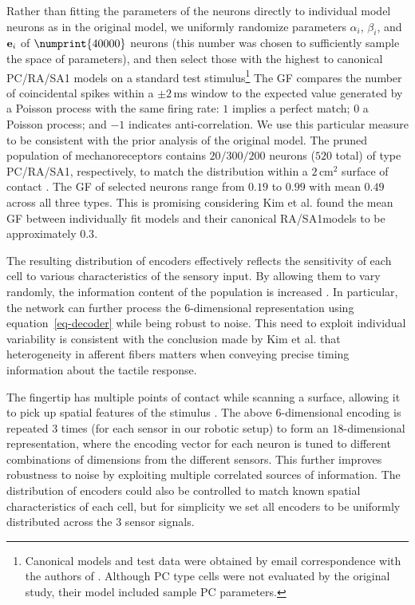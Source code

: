 Rather than fitting the parameters of the neurons directly to individual model neurons  as in the original model, we uniformly randomize parameters $\alpha_i$, $\beta_i$, and $\mathbf{e}_i$ of $\numprint{40000}$ neurons (this number was chosen to sufficiently sample the space of parameters), and then select those with the highest \gammafactor{} \cite{jolivet2008benchmark} to canonical PC/RA/SA1 models on a standard test stimulus\footnote{Canonical models and test data were obtained by email correspondence with the authors of \cite{kim2011does}. Although PC type cells were not evaluated by the original study, their model included sample PC parameters.}
The GF compares the number of coincidental spikes within a $\pm 2$\,ms window to the expected value generated by a Poisson process with the same firing rate: $1$ implies a perfect match; $0$ a Poisson process; and $-1$ indicates anti-correlation. We use this particular measure to be consistent with the  prior analysis of the original model. %
The pruned population of mechanoreceptors contains $20/300/200$ neurons ($520$ total)  of type PC/RA/SA1, respectively, to match the distribution within a $2$\,cm$^2$ %
surface of contact \cite{johansson2009coding}. %
The GF of selected neurons range from $0.19$ to $0.99$  with mean $0.49$ across all three types. This is promising considering Kim et al. \cite{kim2011does} found the mean GF between individually fit models and their canonical RA/SA1models to be approximately $0.3$.

The resulting distribution of encoders effectively reflects the sensitivity of each cell to various characteristics of the sensory input. By allowing them to vary randomly, the information content of the population is increased \cite{hunsberger2014}. In particular, the network can further process the $6$-dimensional representation using equation~\ref{eq-decoder}  while being robust to noise.
This need to exploit individual variability is consistent with the conclusion made by Kim et al. \cite{kim2011does} that heterogeneity in afferent fibers matters when conveying precise timing information about the tactile response.

The fingertip has multiple points of contact while scanning a surface, allowing it to pick up spatial features of the stimulus \cite{weber2013spatial}. The above $6$-dimensional encoding is repeated 3 times (for each sensor in our robotic setup)  to form an $18$-dimensional representation, where the encoding vector for each neuron is tuned to different combinations of dimensions from the different sensors. This further improves robustness to noise by exploiting multiple correlated sources of information. %
The distribution of encoders could also be controlled to match known spatial characteristics of each cell, but for simplicity we set all encoders to be uniformly distributed across the 3 sensor signals.

